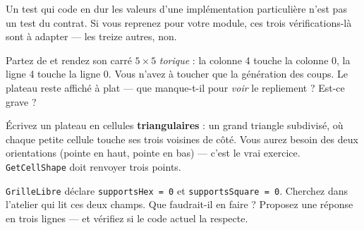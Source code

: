 \begin{nkretenir}
Un test qui code en dur les valeurs d'une implémentation particulière n'est pas un
test du contrat. Si vous reprenez  pour votre
module, ces trois vérifications-là sont à adapter — les treize autres, non.
\end{nkretenir}

\begin{nkexo}[1 — Le tore]
Partez de  et rendez son carré $5\times5$
\emph{torique} : la colonne 4 touche la colonne 0, la ligne 4 touche la ligne 0.
Vous n'avez à toucher que la génération des coups. Le plateau reste affiché à
plat — que manque-t-il pour \emph{voir} le repliement ? Est-ce grave ?
\end{nkexo}

\begin{nkexo}[2 — Le triangle]
Écrivez un plateau en cellules \textbf{triangulaires} : un grand triangle
subdivisé, où chaque petite cellule touche ses trois voisines de côté. Vous aurez
besoin des deux orientations (pointe en haut, pointe en bas) — c'est le vrai
exercice. \texttt{GetCellShape} doit renvoyer trois points.
\end{nkexo}

\begin{nkexo}
\texttt{GrilleLibre} déclare \texttt{supportsHex = 0} et \texttt{supportsSquare
= 0}. Cherchez dans l'atelier qui lit ces deux champs. Que faudrait-il en faire ?
Proposez une réponse en trois lignes — et vérifiez si le code actuel la respecte.
\end{nkexo}
